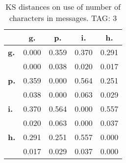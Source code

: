 \begin{table}[h!]
\begin{center}
\begin{tabular}{| l || c | c | c | c |}\hline
 & {\bf g.} & {\bf p.} & {\bf i.} & {\bf h.} \\\hline\hline
{\bf g.} & 0.000 & 0.359 & 0.370 & 0.291 \\
{\bf } & 0.000 & 0.038 & 0.020 & 0.017 \\\hline
{\bf p.} & 0.359 & 0.000 & 0.564 & 0.251 \\
{\bf } & 0.038 & 0.000 & 0.063 & 0.029 \\\hline
{\bf i.} & 0.370 & 0.564 & 0.000 & 0.557 \\
{\bf } & 0.020 & 0.063 & 0.000 & 0.037 \\\hline
{\bf h.} & 0.291 & 0.251 & 0.557 & 0.000 \\
{\bf } & 0.017 & 0.029 & 0.037 & 0.000 \\\hline
\end{tabular}
\caption{KS distances on use of number of characters in messages. TAG: 3}
\end{center}
\end{table}